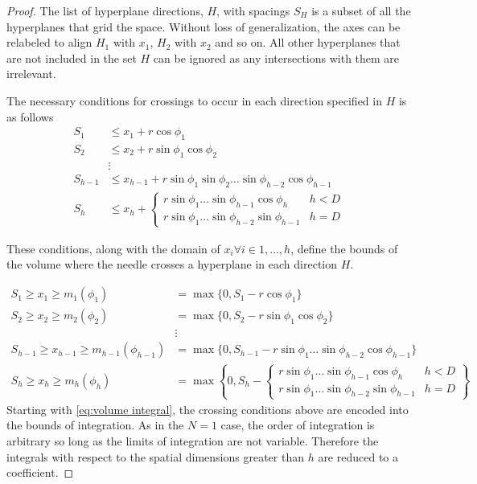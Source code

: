 \documentclass{article}
\begin{document}
\begin{proof}
	The list of hyperplane directions, $H$, with spacings $S_H$ is a subset of all the 
	hyperplanes that grid the space. Without loss of generalization, the axes can be relabeled to
	align $H_1$ with $x_1$, $H_2$ with $x_2$ and so on. All other hyperplanes that are not included
	in the set $H$ can be ignored as any intersections with them are irrelevant.

	The necessary conditions for crossings to occur in each direction specified in $H$ is as follows
	\begin{align}
		S_1 &\le x_1 + r\cos\phi_1\\
		S_2 &\le x_2 + r\sin\phi_1\cos\phi_2\\
		&\vdots \\
		S_{h-1} &\le x_{h-1} + r\sin\phi_1\sin\phi_2\hdots\sin\phi_{h-2}\cos\phi_{h-1}\\
		S_{h} &\le x_h + \begin{cases}
			r\sin\phi_1\hdots\sin\phi_{h-1}\cos\phi_{h} & h < D \\
			r\sin\phi_1\hdots\sin\phi_{h-2}\sin\phi_{h-1} & h = D
		\end{cases}
	\end{align}

	These conditions, along with the domain of $x_i \forall i\in {1,\hdots,h}$, define the bounds of the
	volume where the needle crosses a hyperplane in each direction $H$.
	
	\begin{align}
		S_1 \ge x_1 \ge m_1(\phi_1) &= \max\{0, S_1-r\cos\phi_1\}\\
		S_2 \ge x_2 \ge m_2(\phi_2) &= \max\{0, S_2-r\sin\phi_1\cos\phi_2\}\\
		&\vdots \\
		S_{h-1} \ge x_{h-1} \ge m_{h-1}(\phi_{h-1}) &= \max\{0, S_{h-1}-r\sin\phi_1\hdots\sin\phi_{h-2}\cos\phi_{h-1}\}\\
		S_h \ge x_h \ge m_{h}(\phi_{h}) &= \max\left\{0, S_h - \begin{cases}
			r\sin\phi_1\hdots\sin\phi_{h-1}\cos\phi_{h} & h < D\\
			r\sin\phi_1\hdots\sin\phi_{h-2}\sin\phi_{h-1} & h = D
		\end{cases} \right\}
	\end{align}
	Starting with \ref{eq:volume integral}, the crossing conditions above are encoded into
	the bounds of integration. As in the $N=1$ case, the order of integration is arbitrary
	so long as the limits of integration are not variable. Therefore the integrals with respect to the
	spatial dimensions greater than $h$ are reduced to a coefficient.


\end{proof}
\end{document}
